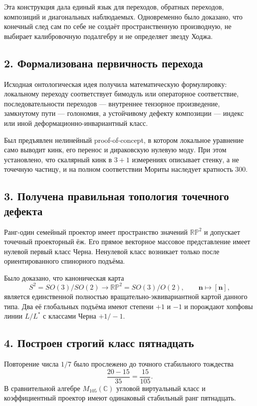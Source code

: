 Эта конструкция дала единый язык для переходов, обратных переходов,
композиций и диагональных наблюдаемых. Одновременно было доказано, что
конечный след сам по себе не создаёт пространственную производную, не
выбирает калибровочную подалгебру и не определяет звезду Ходжа.

\subsection*{2. Формализована первичность перехода}

Исходная онтологическая идея получила математическую формулировку:
локальному переходу соответствует бимодуль или операторное соответствие,
последовательности переходов --- внутреннее тензорное произведение,
замкнутому пути --- голономия, а устойчивому дефекту композиции --- индекс
или иной деформационно-инвариантный класс.

Был предъявлен нелинейный proof-of-concept, в котором локальное уравнение
само выводит кинк, его перенос и дираковскую нулевую моду. При этом
установлено, что скалярный кинк в $3+1$ измерениях описывает стенку, а не
точечную частицу, и на полном соответствии Мориты наследует кратность
$300$.

\subsection*{3. Получена правильная топология точечного дефекта}

Ранг-один семейный проектор имеет пространство значений
$\mathbb{RP}^2$ и допускает точечный проекторный ёж. Его прямое векторное
массовое представление имеет нулевой первый класс Черна. Ненулевой класс
возникает только после ориентированного спинорного подъёма.

Было доказано, что каноническая карта
\begin{equation}
 S^2=SO(3)/SO(2)
 \longrightarrow
 \mathbb{RP}^2=SO(3)/O(2),
 \qquad \mathbf n\longmapsto[\mathbf n],
\end{equation}
является единственной полностью вращательно-эквивариантной картой данного
типа. Два её глобальных подъёма имеют степени $+1$ и $-1$ и порождают
хопфовы линии $L/L^*$ с классами Черна $+1/-1$.

\subsection*{4. Построен строгий класс пятнадцать}

Повторение числа $1/7$ было прослежено до точного стабильного тождества
\begin{equation}
 \frac{20-15}{35}=\frac{15}{105}.
\end{equation}
В сравнительной алгебре $M_{105}(\mathbb C)$ угловой виртуальный класс и
коэффициентный проектор имеют одинаковый стабильный ранг пятнадцать.

